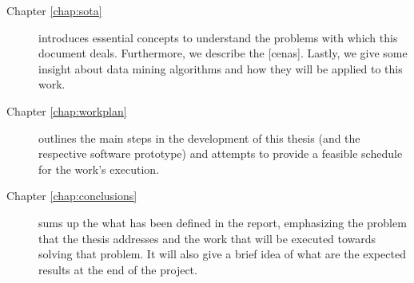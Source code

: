 \begin{description}

  \item[Chapter \ref{chap:sota}]
  introduces essential concepts to understand the problems with which this document deals. Furthermore, we describe the [cenas]. Lastly, we give some insight about data mining algorithms and how they will be applied to this work.

  \item[Chapter \ref{chap:workplan}]
  outlines the main steps in the development of this thesis (and the respective
  software prototype) and attempts to provide a feasible schedule for the work's
  execution.

  \item[Chapter \ref{chap:conclusions}]
  sums up the what has been defined in the report, emphasizing the problem that
  the thesis addresses and the work that will be executed towards solving that
  problem. It will also give a brief idea of what are the expected results at
  the end of the project.

\end{description}
